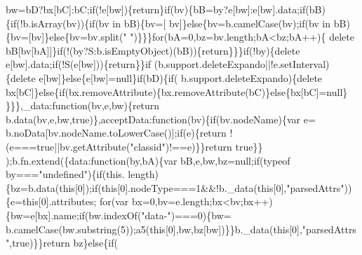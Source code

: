 \begin{DoxyCode}
      bw=bD?bx[bC]:bC;\textcolor{keywordflow}{if}(!e[bw])\{\textcolor{keywordflow}{return}\}\textcolor{keywordflow}{if}(bv)\{bB=by?e[bw]:e[bw].data;\textcolor{keywordflow}{if}(bB)\{\textcolor{keywordflow}{if}(!b.isArray(bv))\{\textcolor{keywordflow}{if}(bv in bB)\{bv=[
      bv]\}\textcolor{keywordflow}{else}\{bv=b.camelCase(bv);\textcolor{keywordflow}{if}(bv in bB)\{bv=[bv]\}\textcolor{keywordflow}{else}\{bv=bv.split(\textcolor{stringliteral}{" "})\}\}\}\textcolor{keywordflow}{for}(bA=0,bz=bv.length;bA<bz;bA++)\{\textcolor{keyword}{
      delete} bB[bv[bA]]\}\textcolor{keywordflow}{if}(!(by?S:b.isEmptyObject)(bB))\{\textcolor{keywordflow}{return}\}\}\}\textcolor{keywordflow}{if}(!by)\{\textcolor{keyword}{delete} e[bw].data;\textcolor{keywordflow}{if}(!S(e[bw]))\{\textcolor{keywordflow}{return}\}\}\textcolor{keywordflow}{if}
      (b.support.deleteExpando||!e.setInterval)\{\textcolor{keyword}{delete} e[bw]\}\textcolor{keywordflow}{else}\{e[bw]=null\}\textcolor{keywordflow}{if}(bD)\{\textcolor{keywordflow}{if}(
      b.support.deleteExpando)\{\textcolor{keyword}{delete} bx[bC]\}\textcolor{keywordflow}{else}\{\textcolor{keywordflow}{if}(bx.removeAttribute)\{bx.removeAttribute(bC)\}\textcolor{keywordflow}{else}\{bx[bC]=null\}
      \}\}\},\_data:\textcolor{keyword}{function}(bv,e,bw)\{\textcolor{keywordflow}{return} b.data(bv,e,bw,\textcolor{keyword}{true})\},acceptData:\textcolor{keyword}{function}(bv)\{\textcolor{keywordflow}{if}(bv.nodeName)\{var e=
      b.noData[bv.nodeName.toLowerCase()];\textcolor{keywordflow}{if}(e)\{\textcolor{keywordflow}{return} !(e===\textcolor{keyword}{true}||bv.getAttribute(\textcolor{stringliteral}{"classid"})!==e)\}\}\textcolor{keywordflow}{return} \textcolor{keyword}{true}\}\}
      );b.fn.extend(\{data:\textcolor{keyword}{function}(by,bA)\{var bB,e,bw,bz=null;\textcolor{keywordflow}{if}(typeof by===\textcolor{stringliteral}{"undefined"})\{\textcolor{keywordflow}{if}(this.
      length)\{bz=b.data(\textcolor{keyword}{this}[0]);\textcolor{keywordflow}{if}(\textcolor{keyword}{this}[0].nodeType===1&&!b.\_data(\textcolor{keyword}{this}[0],\textcolor{stringliteral}{"parsedAttrs"}))\{e=\textcolor{keyword}{this}[0].attributes;\textcolor{keywordflow}{
      for}(var bx=0,bv=e.length;bx<bv;bx++)\{bw=e[bx].name;\textcolor{keywordflow}{if}(bw.indexOf(\textcolor{stringliteral}{"data-"})===0)\{bw=
      b.camelCase(bw.substring(5));a5(\textcolor{keyword}{this}[0],bw,bz[bw])\}\}b.\_data(\textcolor{keyword}{this}[0],\textcolor{stringliteral}{"parsedAttrs"},\textcolor{keyword}{true})\}\}\textcolor{keywordflow}{return} bz\}\textcolor{keywordflow}{else}\{\textcolor{keywordflow}{if}(

\end{DoxyCode}
